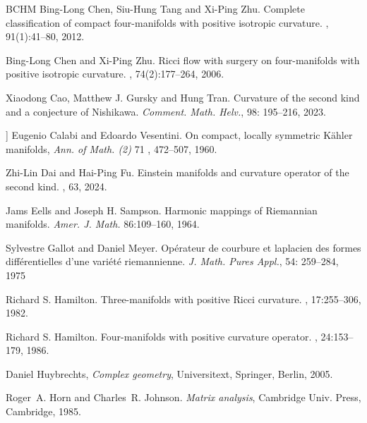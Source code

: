\documentclass[12pt, reqno]{amsart}
\theoremstyle{plain}
\theoremstyle{definition}
\renewcommand{\>}{\rightarrow}
\renewcommand{\#}{\sharp}
\numberwithin{equation}{section} %
\begin{document}
\begin{thebibliography}{BCHM}
    Bing-Long Chen, Siu-Hung Tang and Xi-Ping Zhu.
    \newblock Complete classification of compact four-manifolds with positive isotropic curvature.
    , 91(1):41--80, 2012.

    Bing-Long Chen and Xi-Ping Zhu.
    \newblock Ricci flow with surgery on four-manifolds with positive isotropic curvature.
    , 74(2):177--264, 2006.







    Xiaodong Cao, Matthew J.  Gursky and Hung Tran.
    Curvature of the second kind and a conjecture of Nishikawa. {\emph{Comment. Math. Helv.}},  98: 195--216, 2023.


] Eugenio Calabi and Edoardo Vesentini.  On compact, locally symmetric K\"ahler manifolds,  \emph{Ann.
of Math. (2)}  71 , 472--507, 1960.


    Zhi-Lin Dai and Hai-Ping Fu.
    \newblock Einstein manifolds and curvature operator of the second kind.
    , 63, 2024.

    Jams Eells and Joseph H. Sampson. Harmonic mappings of Riemannian manifolds. \emph{Amer. J. Math.}  86:109--160, 1964.



    Sylvestre
    Gallot and Daniel Meyer.
    Opérateur de courbure et laplacien des formes différentielles d'une variété riemannienne. {\em{J. Math. Pures Appl.}}, 54: 259--284, 1975








    Richard S. Hamilton.
    \newblock Three-manifolds with positive Ricci curvature.
    , 17:255--306, 1982.

    Richard S. Hamilton.
    \newblock Four-manifolds with positive curvature operator.
    , 24:153--179, 1986.

 Daniel Huybrechts, {\it Complex geometry}, Universitext, Springer, Berlin, 2005.

    Roger~A. Horn and Charles~R. Johnson. {\it Matrix analysis}, Cambridge Univ. Press, Cambridge, 1985.


\end{thebibliography}
\end{document}
